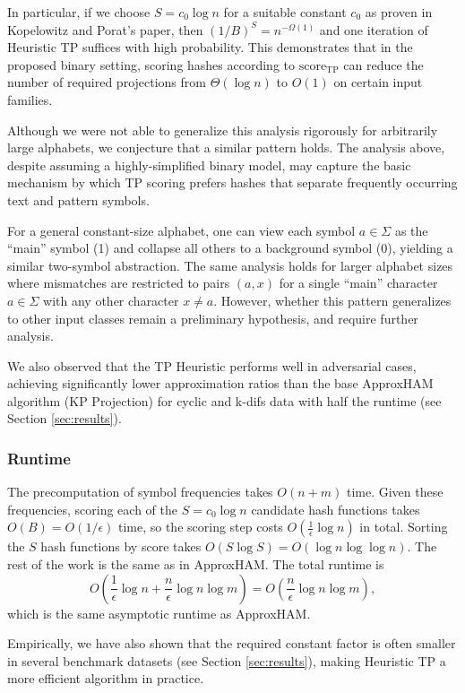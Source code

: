 \documentclass{article}
\theoremstyle{definition}
\newcommand{\score}{\text{score}}
\newcommand{\KP}{Kopelowitz and Porat}
\begin{document}
In particular, if we choose $S = c_0 \log n$ for a suitable constant
$c_0$ as proven in \KP's paper, then $(1/B)^S = n^{-\Omega(1)}$ and one iteration of Heuristic TP suffices with high probability. This demonstrates that in the proposed binary setting, scoring hashes according to $\score_\text{TP}$ can reduce the number of required projections from $\Theta(\log n)$ to $O(1)$ on certain input families.

Although we were not able to generalize this analysis rigorously for arbitrarily large alphabets, we conjecture that a similar pattern holds. The analysis above, despite assuming a highly-simplified binary model, may capture the basic mechanism by which TP scoring prefers hashes that separate frequently occurring text and pattern symbols.

For a general constant-size alphabet, one can view each symbol $a\in\Sigma$ as the ``main'' symbol (1) and collapse all others to a background symbol (0), yielding a similar two-symbol abstraction.
The same analysis holds for larger alphabet sizes where mismatches are restricted to pairs $(a,x)$ for a single ``main'' character $a\in\Sigma$ with any other character $x\ne a$. However, whether this pattern generalizes to other input classes remain a preliminary hypothesis, and require further analysis.

We also observed that the TP Heuristic performs well in adversarial cases, achieving significantly lower approximation ratios than the base ApproxHAM algorithm (KP Projection) for cyclic and k-difs data with half the runtime (see Section \ref{sec:results}).

\subsubsection{Runtime}
The precomputation of symbol frequencies takes $O(n+m)$ time. 
Given these frequencies, scoring each of the $S = c_0 \log n$ candidate hash functions takes $O(B) = O(1/\epsilon)$ time, so the scoring step costs $O\left(\frac{1}{\epsilon}\log n\right)$ in total.
Sorting the $S$ hash functions by score takes $O(S \log S) = O(\log n \log \log n)$.
The rest of the work is the same as in ApproxHAM. The total runtime is
$$O\left(\frac{1}{\epsilon} \log n + \frac{n}{\epsilon} \log n\log m\right)=O\left(\frac{n}{\epsilon} \log n\log m\right),$$
which is the same asymptotic runtime as ApproxHAM.

Empirically, we have also shown that the required constant factor is often smaller in several benchmark datasets (see Section \ref{sec:results}), making Heuristic TP a more efficient algorithm in practice. 
\end{document}
